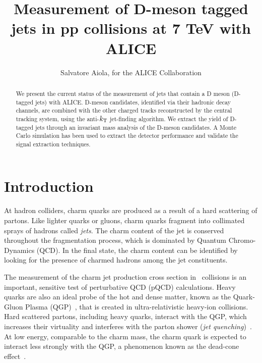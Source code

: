\documentclass[a4paper]{jpconf}
\begin{document}
\title{Measurement of D-meson tagged jets in pp collisions at 7 TeV with ALICE}

\author{Salvatore Aiola, for the ALICE Collaboration}

\address{Physics Department, Yale University, 266 Whitney Avenue, New Haven, CT 06511}


\begin{abstract}
We present the current status of the measurement of jets that contain a D meson (D-tagged jets) with \mbox{ALICE}.
D-meson candidates, identified via their hadronic decay channels, are combined with the other charged tracks reconstructed by the central tracking system, 
using the anti-$k_{\rm T}$ jet-finding algorithm.
We extract the yield of D-tagged jets through an invariant mass analysis of the D-meson candidates.
A Monte Carlo simulation has been used to extract the detector performance and validate the signal extraction techniques.
\end{abstract}

\section{Introduction}
At hadron colliders, charm quarks are produced as a result of a hard scattering of partons. Like lighter quarks or gluons, charm quarks
fragment into collimated sprays of hadrons called \emph{jets}. The charm content of the jet is conserved throughout the fragmentation process,
which is dominated by Quantum Chromo-Dynamics (QCD).
In the final state, the charm content can be identified by looking for the presence of charmed hadrons among the jet constituents.

The measurement of the charm jet production cross section in \pp\ collisions is an important, sensitive test of perturbative QCD (pQCD) calculations.
Heavy quarks are also an ideal probe of the hot and dense matter, 
known as the Quark-Gluon Plasma (QGP)~\cite{STAR:2005a, PHENIX:2005a}, 
that is created in ultra-relativistic heavy-ion collisions. 
Hard scattered partons, including heavy quarks, interact with the QGP, which increases their virtuality and interferes with the
parton shower (\emph{jet quenching})~\cite{PHENIX:2008b, CMS:2012b, ALICE:2015a}.
At low energy, comparable to the charm mass, the charm quark is expected
to interact less strongly with the QGP, a phenomenon known as the dead-cone effect~\cite{Dokshitzer:2001}.
\end{document}
